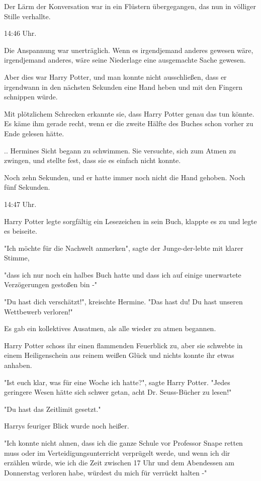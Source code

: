 {Der Lärm der Konversation war in ein Flüstern übergegangen, das nun in völliger Stille verhallte.

14:46 Uhr.

Die Anspannung war unerträglich. Wenn es irgendjemand anderes gewesen wäre, irgendjemand anderes, wäre seine Niederlage eine ausgemachte Sache gewesen.

Aber dies war Harry Potter, und man konnte nicht ausschließen, dass er irgendwann in den nächsten Sekunden eine Hand heben und mit den Fingern schnippen würde.

Mit plötzlichem Schrecken erkannte sie, dass Harry Potter genau das tun könnte. Es käme ihm gerade recht, wenn er die zweite Hälfte des Buches schon vorher zu Ende gelesen hätte.

.. Hermines Sicht begann zu schwimmen. Sie versuchte, sich zum Atmen zu zwingen, und stellte fest, dass sie es einfach nicht konnte.

Noch zehn Sekunden, und er hatte immer noch nicht die Hand gehoben. Noch fünf Sekunden.

14:47 Uhr.

Harry Potter legte sorgfältig ein Lesezeichen in sein Buch, klappte es zu und legte es beiseite.

"Ich möchte für die Nachwelt anmerken", sagte der Junge-der-lebte mit klarer Stimme,

"dass ich nur noch ein halbes Buch hatte und dass ich auf einige unerwartete Verzögerungen gestoßen bin -"

"Du hast dich verschätzt!", kreischte Hermine. "Das hast du! Du hast unseren Wettbewerb verloren!"

Es gab ein kollektives Ausatmen, als alle wieder zu atmen begannen.

Harry Potter schoss ihr einen flammenden Feuerblick zu, aber sie schwebte in einem Heiligenschein aus reinem weißen Glück und nichts konnte ihr etwas anhaben.

"Ist euch klar, was für eine Woche ich hatte?", sagte Harry Potter. "Jedes geringere Wesen hätte sich schwer getan, acht Dr. Seuss-Bücher zu lesen!"

"Du hast das Zeitlimit gesetzt."

Harrys feuriger Blick wurde noch heißer.

"Ich konnte nicht ahnen, dass ich die ganze Schule vor Professor Snape retten muss oder im Verteidigungsunterricht verprügelt werde, und wenn ich dir erzählen würde, wie ich die Zeit zwischen 17 Uhr und dem Abendessen am Donnerstag verloren habe, würdest du mich für verrückt halten -"

}
